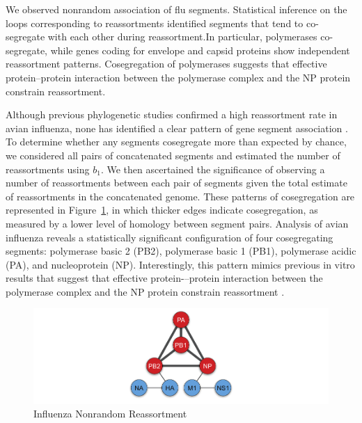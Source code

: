 We observed nonrandom association of flu segments.
Statistical inference on the loops corresponding to reassortments identified segments that tend to co-segregate with each other during reassortment.In particular, polymerases co-segregate, while genes coding for envelope and capsid proteins show independent reassortment patterns.
Cosegregation of polymerases suggests that effective protein–protein interaction between the polymerase complex and the NP protein constrain reassortment. 

Although previous phylogenetic studies confirmed a high reassortment rate in avian influenza, none has identified a clear pattern of gene segment association \cite{Dugan:2008iba}.
To determine whether any segments cosegregate more than expected by chance, we considered all pairs of concatenated segments and estimated the number of reassortments using $b_{1}$.
We then ascertained the significance of observing a number of reassortments between each pair of segments given the total estimate of reassortments in the concatenated genome.
These patterns of cosegregation are represented in Figure~\ref{fig:flu:nonrandom_reassortment}, in which thicker edges indicate cosegregation, as measured by a lower level of homology between segment pairs.
Analysis of avian influenza reveals a statistically significant configuration of four cosegregating segments: polymerase basic 2 (PB2), polymerase basic 1 (PB1), polymerase acidic (PA), and nucleoprotein (NP).
Interestingly, this pattern mimics previous in vitro results that suggest that effective protein-–protein interaction between the polymerase complex and the NP protein constrain reassortment \cite{Lubeck:1979ws}.

\begin{figure}
\begin{center}
\centerline{\includegraphics[width=\columnwidth]{./fig/influenza/flu_reassortment_correlations.pdf}}
\caption[Influenza Nonrandom Reassortment]{Influenza Nonrandom Reassortment}
\label{fig:flu:nonrandom_reassortment}
\end{center}
\end{figure}

